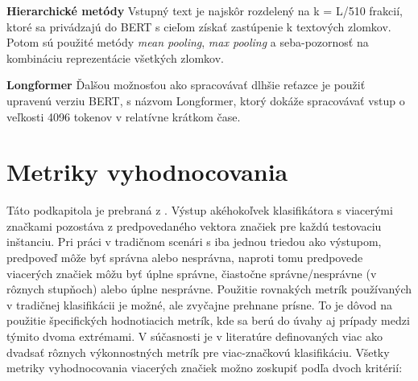 \textbf{Hierarchické metódy} Vstupný text je najskôr rozdelený na k = L/510 frakcií, ktoré sa privádzajú do BERT s cieľom získať zastúpenie k textových zlomkov. Potom sú použité metódy \textit{mean pooling}, \textit{max pooling} a seba-pozornosť na kombináciu reprezentácie všetkých zlomkov.\cite{Sun:2019}

\textbf{Longformer} \cite{Beltagy:2020} Ďalšou možnosťou ako spracovávať dlhšie reťazce je použiť upravenú verziu BERT, s názvom Longformer, ktorý dokáže spracovávať vstup o veľkosti 4096 tokenov v relatívne krátkom čase.


\section{Metriky vyhodnocovania}

Táto podkapitola je prebraná z \cite{Herrera:2016}. Výstup akéhokoľvek klasifikátora s viacerými značkami pozostáva z predpovedaného vektora značiek pre každú testovaciu inštanciu. Pri práci v tradičnom scenári s iba jednou triedou ako výstupom,  predpoveď môže byť správna alebo nesprávna, naproti tomu predpovede viacerých značiek môžu byť úplne správne, čiastočne správne/nesprávne (v rôznych stupňoch) alebo úplne nesprávne.
Použitie rovnakých metrík používaných v tradičnej klasifikácii je možné, ale zvyčajne prehnane prísne. To je dôvod na použitie špecifických hodnotiacich metrík, kde sa berú do úvahy aj prípady medzi týmito dvoma extrémami.
V súčasnosti je v literatúre definovaných viac ako dvadsať rôznych výkonnostných metrík pre viac-značkovú klasifikáciu. Všetky metriky vyhodnocovania viacerých značiek možno zoskupiť podľa dvoch kritérií:
